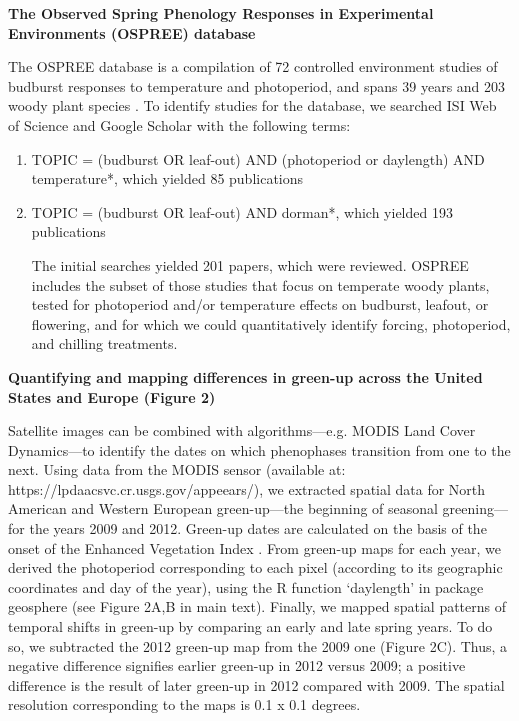 \documentclass{article}
\begin{document}
\par \textbf{The Observed Spring Phenology Responses in Experimental Environments (OSPREE) database}
\par The OSPREE database is a compilation of 72 controlled environment studies of budburst responses to temperature and photoperiod, and spans 39 years and 203 woody plant species \citep{wolkovich2019}.  To identify studies for the database, we searched ISI Web of Science and Google Scholar with the following terms: 
\begin{enumerate}
\item TOPIC = (budburst OR leaf-out) AND (photoperiod or daylength) AND temperature*, which yielded 85 publications

\item TOPIC = (budburst OR leaf-out) AND dorman*, which yielded 193 publications

The initial searches yielded 201 papers, which were reviewed. OSPREE includes the subset of those studies that focus on temperate woody plants, tested for photoperiod and/or temperature effects on budburst, leafout, or flowering, and for which we could quantitatively identify forcing, photoperiod, and chilling treatments.

\end{enumerate}\par \textbf{Quantifying and mapping differences in green-up across the United States and Europe (Figure 2)}
\par Satellite images can be combined with algorithms---e.g. MODIS Land Cover Dynamics---to identify the dates on which phenophases transition from one to the next. Using data from the MODIS sensor (available at:  https://lpdaacsvc.cr.usgs.gov/appeears/), we extracted spatial data for North American and Western European green-up---the beginning of seasonal greening---for the years 2009 and 2012. Green-up dates are calculated on the basis of the onset of the Enhanced Vegetation Index \citep{huete2002}. From green-up maps for each year, we derived the photoperiod corresponding to each pixel (according to its geographic coordinates and day of the year), using the R function `daylength' in package geosphere (see Figure 2A,B in main text). Finally, we mapped spatial patterns of temporal shifts in green-up by comparing an early and late spring years. To do so, we subtracted the 2012 green-up map from the 2009 one (Figure 2C). Thus, a negative difference signifies earlier green-up in 2012 versus 2009;  a positive difference is the result of later green-up in 2012 compared with 2009. The spatial resolution corresponding to the maps is 0.1 x 0.1 degrees.
\end{document}
